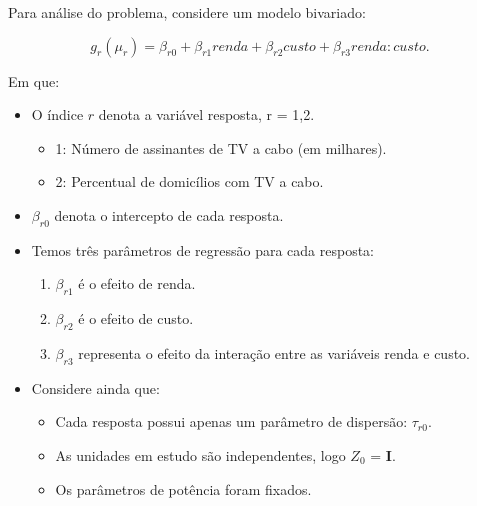 \documentclass[10pt,
  aspectratio=169,
  serif,
  mathserif,
  professionalfont,
  compress,
  handout,
  ]{beamer}\usepackage[]{graphicx}\usepackage[]{color}
\begin{document}
\begin{frame}

Para análise do problema, considere um modelo bivariado:

$$
g_r(\mu_r) = \beta_{r0} + \beta_{r1} renda + \beta_{r2} custo + \beta_{r3} renda:custo.
$$

Em que:

\begin{itemize}
    \itemsep 2ex

  \item O índice $r$ denota a variável resposta, r = 1,2.
    \begin{itemize}
      \item 1: Número de assinantes de TV a cabo (em milhares).
      \item 2: Percentual de domicílios com TV a cabo.
    \end{itemize}

  \item $\beta_{r0}$ denota o intercepto de cada resposta. 

  \item Temos três parâmetros de regressão para cada resposta:
  
  \begin{enumerate}
    
    \item $\beta_{r1}$ é o efeito de renda. 
    
    \item $\beta_{r2}$ é o efeito de custo.
    
    \item $\beta_{r3}$ representa o efeito da interação entre as variáveis renda e custo.
    
  \end{enumerate}

\item Considere ainda que:

  \begin{itemize}
    \item Cada resposta possui apenas um parâmetro de dispersão: $\tau_{r0}$.
    \item As unidades em estudo são independentes, logo $Z_0$ = \textbf{I}.
    \item Os parâmetros de potência foram fixados.
  \end{itemize}

\end{itemize}

\end{frame}
\end{document}
